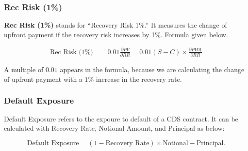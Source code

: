 \documentclass{jss}
\begin{document}
\subsubsection{Rec Risk (1\%)}
\textbf{Rec Risk (1\%)} stands for ``Recovery Risk 1\%.'' It measures the change of upfront payment if the recovery risk increases by 1\%. Formula given below.

\begin{align*}
  \text{Rec Risk (1\%)} &= 0.01 \frac{\partial PV}{\partial RR} = 0.01 (S - C) \times \frac{\partial PV01}{\partial RR}
\end{align*}

A multiple of $0.01$ appears in the formula, because we are calculating the change of upfront payment with a $1\%$ increase in the recovery rate.

\subsubsection{Default Exposure}
\label{sec:DefaultExpo}

Default Exposure refers to the expoure to default of a CDS contract. It can be calculated with Recovery Rate, Notional Amount, and Principal as below:

\begin{equation}
  \text{Default Exposure} = (1 - \text{Recovery Rate}) \times \text{Notional}
  - \text{Principal}. \nonumber
\end{equation} 
\end{document}
